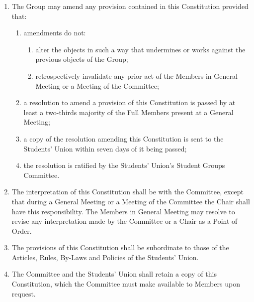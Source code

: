 \documentclass[12pt]{constitution}
\begin{document}
\begin{enumerate}
    \item The Group may amend any provision contained in this Constitution provided that:
    \begin{enumerate}
        \item amendments do not:
        \begin{enumerate}
            \item alter the objects in such a way that undermines or works against the previous objects of the Group;
            \item retrospectively invalidate any prior act of the Members in General Meeting or a Meeting of the Committee;
        \end{enumerate}

        \item a resolution to amend a provision of this Constitution is passed by at least a two-thirds majority of the Full Members present at a General Meeting;
        \item a copy of the resolution amending this Constitution is sent to the Students' Union within seven days of it being passed;
        \item the resolution is ratified by the Students' Union's Student Groups Committee.
    \end{enumerate}

    \item The interpretation of this Constitution shall be with the Committee, except that during a General Meeting or a Meeting of the Committee the Chair shall have this responsibility.  The Members in General Meeting may resolve to revise any interpretation made by the Committee or a Chair as a Point of Order.
    \item The provisions of this Constitution shall be subordinate to those of the Articles, Rules, By-Laws and Policies of the Students' Union.
    \item The Committee and the Students' Union shall retain a copy of this Constitution, which the Committee must make available to Members upon request.
\end{enumerate}


\label{article:dissolution}
\end{document}
